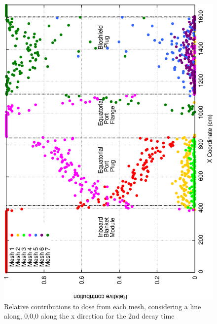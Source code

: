 \documentclass[12pt]{article}
\begin{document}
\begin{figure}[ht!]
\centering
\includegraphics[clip,scale=0.25]{../plots/crosstalk/nob4c/ep/dc2_rel.png}
\caption{Relative contributions to dose from each mesh, considering a line along, 0,0,0 along the x direction for the 2nd decay time}
\label{fig:ct_ep_dc2_rel}
\end{figure}
\end{document}
